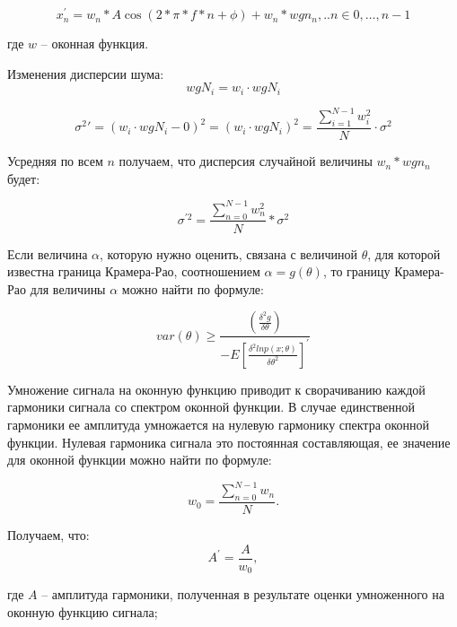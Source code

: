 \begin{equation}
	\label{eq:equation11}
	x_n^{'}= w_n*A\cos(2*\pi*f*n+\phi)+w_n*wgn_n,..n\in 0,…,n-1
\end{equation}

где $w$ -- оконная функция.

Изменения дисперсии шума:
\begin{equation}
\label{eq:equation12}
w g N_i = w_i \cdot w g N_i
\end{equation}

\begin{equation}
	\label{eq:equation13}
{\sigma^2}' = (w_i \cdot w g N_i - 0)^2=(w_i \cdot w g N_i)^2 =\frac{\displaystyle\sum_{i=1}^{N-1} w_i^2}{N} \cdot \sigma^2
\end{equation}

Усредняя по всем $n$ получаем, что дисперсия случайной величины $w_n*wgn_n$ будет: 

\begin{equation}
	\label{eq:equation14}
	\sigma^{'2}=\frac{\sum_{n=0}^{N-1} w_n^2}{N}*\sigma^2
\end{equation}

Если величина $\alpha$, которую нужно оценить, связана с величиной $\theta$, для которой известна граница Крамера-Рао, соотношением $\alpha=g(\theta)$, то границу Крамера-Рао для величины $\alpha$ можно найти по формуле: 

\begin{equation}
	\label{eq:equation15}
	var(\theta)\geq \frac{\left(\frac{\delta^2 g}{\delta\theta}\right)}{-E\left[\frac{\delta^2 ln p(x;\theta)}{\delta \theta^2}\right]^{'}}
\end{equation}

Умножение сигнала на оконную функцию приводит к сворачиванию каждой гармоники сигнала со спектром оконной функции. В случае единственной гармоники ее амплитуда умножается на нулевую гармонику спектра оконной функции. Нулевая гармоника сигнала это постоянная составляющая, ее значение для оконной функции можно найти по формуле: 

\begin{equation}
	\label{eq:equation16}
	w_0= \frac{\sum_{n=0}^{N-1} w_n}{N}.	  
\end{equation}

Получаем, что: 
\begin{equation}
	\label{eq:equation17}
	A^{'}=\frac{A}{w_0} ,		  
\end{equation}

где $A$ -- амплитуда гармоники, полученная в результате оценки умноженного на оконную функцию сигнала; 


